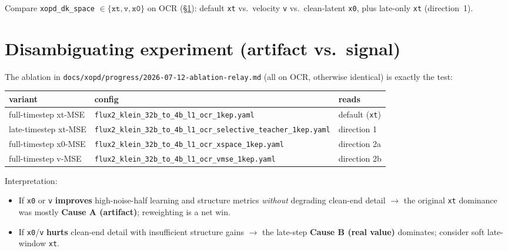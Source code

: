 \documentclass[11pt,a4paper]{article}
\begin{document}
\begin{tcolorbox}[colback=green!5,colframe=green!50!black,title=\textbf{Recommendation}]
Compare \texttt{xopd\_dk\_space} $\in\{\texttt{xt},\texttt{v},\texttt{x0}\}$ on OCR
(\S\ref{sec:experiment}): default \texttt{xt} vs.\ velocity \texttt{v} vs.\ clean-latent
\texttt{x0}, plus late-only \texttt{xt} (direction~1).
\end{tcolorbox}

\section{Disambiguating experiment (artifact vs.\ signal)}
\label{sec:experiment}

The ablation in \texttt{docs/xopd/progress/2026-07-12-ablation-relay.md} (all on OCR, otherwise
identical) is exactly the test:

\begin{center}
\renewcommand{\arraystretch}{1.3}
\footnotesize
\begin{tabular}{@{}p{3.4cm}p{6.6cm}p{2.6cm}@{}}
\toprule
\textbf{variant} & \textbf{config} & \textbf{reads} \\
\midrule
full-timestep xt-MSE & \texttt{flux2\_klein\_32b\_to\_4b\_l1\_ocr\_1kep.yaml} & default (\texttt{xt}) \\
late-timestep xt-MSE & \texttt{flux2\_klein\_32b\_to\_4b\_l1\_ocr\_selective\_teacher\_1kep.yaml} & direction 1 \\
full-timestep x0-MSE & \texttt{flux2\_klein\_32b\_to\_4b\_l1\_ocr\_xspace\_1kep.yaml} & direction 2a \\
full-timestep v-MSE & \texttt{flux2\_klein\_32b\_to\_4b\_l1\_ocr\_vmse\_1kep.yaml} & direction 2b \\
\bottomrule
\end{tabular}
\end{center}

Interpretation:
\begin{itemize}[leftmargin=1.5em]
\item If \texttt{x0} or \texttt{v} \textbf{improves} high-noise-half learning and structure metrics
\emph{without} degrading clean-end detail $\to$ the original \texttt{xt} dominance was mostly
\textbf{Cause A (artifact)}; reweighting is a net win.
\item If \texttt{x0}/\texttt{v} \textbf{hurts} clean-end detail with insufficient structure gains
$\to$ the late-step \textbf{Cause B (real value)} dominates; consider soft late-window \texttt{xt}.
\end{itemize}
\end{document}
